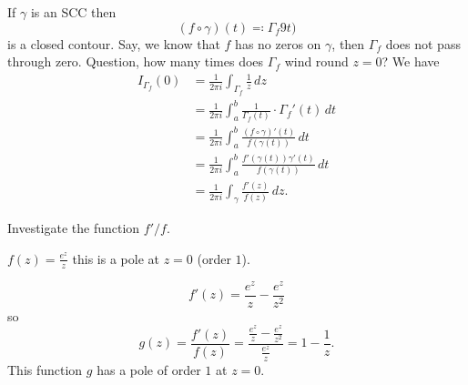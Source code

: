 \documentclass[10pt, a4paper]{article}
\begin{document}
If $\gamma$ is an SCC then
\[
(f \circ \gamma)(t) \eqqcolon \Gamma_{f}9t)
\]
is a closed contour.
Say,
we know that $f$ has no zeros on $\gamma$,
then $\Gamma_f$ does not pass through zero.
Question,
how many times does $\Gamma_f$ wind round $z = 0$?
We have
\begin{align*}
    I_{\Gamma_f}(0) &= \frac{1}{2\pi i}\int_{\Gamma_f}\frac{1}{z}\,dz \\
    &= \frac{1}{2\pi i}\int_{a}^{b}\frac{1}{\Gamma_f(t)}\cdot\Gamma_f'(t)\,dt \\
    &= \frac{1}{2\pi i}\int_{a}^{b}\frac{(f \circ \gamma)'(t)}{f(\gamma(t))}\,dt \\
    &= \frac{1}{2\pi i}\int_{a}^{b}\frac{f'(\gamma(t))\gamma'(t)}{f(\gamma(t))}\,dt \\
    &= \frac{1}{2\pi i}\int_{\gamma}\frac{f'(z)}{f(z)}\,dz.
\end{align*}

Investigate the function $f' / f$.

\begin{example}
    $f(z) = \frac{e ^ z}{z}$ this is a pole at $z = 0$
    (order $1$).

    \[
    f'(z) = \frac{e ^ z}{z} - \frac{e ^ z}{z ^ 2}
    \]
    so
    \[
    g(z) = \frac{f'(z)}{f(z)} = \frac{\frac{e ^ z}{z} - \frac{e ^ z}{z ^ 2}}{\frac{e ^ z}{z}} = 1 - \frac{1}{z}.
    \]
    This function $g$ has a pole of order $1$ at $z = 0$.
\end{example}
\end{document}
